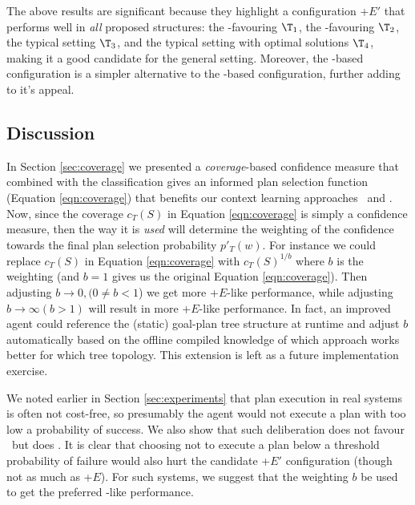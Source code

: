 The above results are significant because they highlight a configuration \CL+$E'$ that performs well in \textit{all} proposed structures: the \CL-favouring $\T_1$, the \BUL-favouring $\T_2$, the typical setting $\T_3$, and the typical setting with optimal solutions $\T_4$, making it a good candidate for the general setting. Moreover, the \CL-based configuration is a simpler alternative to the \BUL-based configuration, further adding to it's appeal.


\subsection{Discussion}

In Section \ref{sec:coverage} we presented a \textit{coverage}-based confidence measure that combined with the \dt classification gives an informed plan selection function (Equation \ref{eqn:coverage}) that benefits our context learning approaches \CL\ and \BUL. Now, since the coverage $c_T(S)$ in Equation \ref{eqn:coverage} is simply a confidence measure, then the way it is \textit{used} will determine the weighting of the confidence towards the final plan selection probability $p'_T(w)$. For instance we could replace $c_T(S)$ in Equation \ref{eqn:coverage} with $c_T(S)^{1/b}$ where $b$ is the weighting (and $b=1$ gives us the original Equation \ref{eqn:coverage}). Then adjusting $b \rightarrow 0, (0 \ne b < 1$) we get more \BUL+$E$-like performance, while adjusting $b \rightarrow \infty (b > 1)$ will result in more \CL+$E$-like performance. In fact, an improved agent could reference the (static) goal-plan tree structure at runtime and adjust $b$ automatically based on the offline compiled knowledge of which approach works better for which tree topology. This extension is left as a future implementation exercise.

We noted earlier in Section \ref{sec:experiments} that plan execution in real systems is often not cost-free, so presumably the agent would not execute a plan with too low a probability of success. We also show that such deliberation does not favour \CL\ but does \BUL. It is clear that choosing not to execute a plan below a threshold probability of failure would also hurt the candidate \CL+$E'$ configuration (though not as much as \CL+$E$). For such systems, we suggest that the weighting $b$ be used to get the preferred \BUL-like performance.

